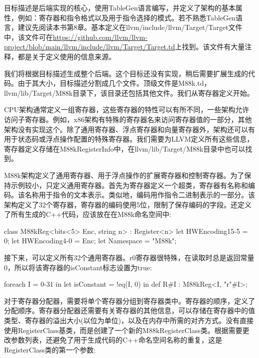 
目标描述是后端实现的核心，使用TableGen语言编写，并定义了架构的基本属性，例如：寄存器和指令格式以及用于指令选择的模式。若不熟悉TableGen语言，建议先阅读本书第8章。基本定义在llvm/include/llvm/Target/Target文件中，该文件可在\url{https://github.com/llvm/llvm-project/blob/main/llvm/include/llvm/Target/Target.td}上找到。该文件有大量注释，都是关于定义使用的信息来源。

我们将根据目标描述生成整个后端。这个目标还没有实现，稍后需要扩展生成的代码。由于其大小，目标描述分割成几个文件。顶级文件是M88k.td，llvm/lib/Target/M88k目录下，该目录还包括其他文件。我们从寄存器定义开始。


CPU架构通常定义一组寄存器，这些寄存器的特性可以有所不同，一些架构允许访问子寄存器。例如，x86架构有特殊的寄存器名来访问寄存器值的一部分，其他架构没有实现这个。除了通用寄存器、浮点寄存器和向量寄存器外，架构还可以有用于状态码或浮点操作配置的特殊寄存器。我们需要为LLVM定义所有这些信息，寄存器定义存储在M88kRegisterInfo中，在llvm/lib/Target/M88k目录中也可以找到。

M88k架构定义了通用寄存器、用于浮点操作的扩展寄存器和控制寄存器。为了保持示例较小，只定义通用寄存器。首先为寄存器定义一个超类，寄存器有名称和编码。该名称用于指令的文本表示。类似地，编码用作指令二进制表示的一部分。该架构定义了32个寄存器，寄存器的编码使用5位，限制了保存编码的字段。还定义了所有生成的C++代码，应该放在在M88k命名空间中:

\begin{cpp}
class M88kReg<bits<5> Enc, string n> : Register<n> {
    let HWEncoding{15-5} = 0;
    let HWEncoding{4-0} = Enc;
    let Namespace = "M88k";
}
\end{cpp}

接下来，可以定义所有32个通用寄存器。r0寄存器很特殊，在读取时总是返回常量0，所以将该寄存器的isConstant标志设置为true:

\begin{cpp}
foreach I = 0-31 in {
    let isConstant = !eq(I, 0) in
        def R#I : M88kReg<I, "r"#I>;
}
\end{cpp}

对于寄存器分配器，需要将单个寄存器分组到寄存器类中。寄存器的顺序，定义了分配顺序。寄存器分配器还需要有关寄存器的其他信息，可以存储在寄存器中的值类型、寄存器的溢出大小(以位为单位)，以及在内存中所需的对齐方式。没有直接使用RegisterClass基类，而是创建了一个新的M88kRegisterClass类。根据需要更改参数列表，还避免了用于生成代码的C++命名空间名称的重复，这是RegisterClass类的第一个参数:

